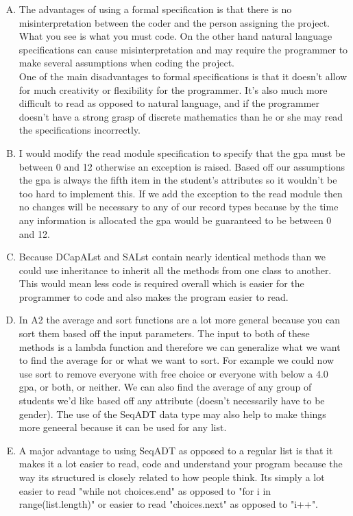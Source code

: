 \documentclass[12pt]{article}
\begin{document}
\begin{enumerate}[A)]

\item The advantages of using a formal specification is that there is no misinterpretation between the coder and the person assigning the project. What you see is what you must code. On the other hand
      natural language specifications can cause misinterpretation and may require the programmer to make several assumptions when coding the project.\\
      One of the main disadvantages to formal specifications is that it doesn't allow for much creativity or flexibility for the programmer. It's also much more difficult to read as opposed to natural language, and
      if the programmer doesn't have a strong grasp of discrete mathematics than he or she may read the specifications incorrectly.

\item I would modify the read module specification to specify that the gpa must be between 0 and 12 otherwise an exception is raised. Based off our assumptions the gpa is always the fifth item
      in the student's attributes so it wouldn't be too hard to implement this. If we add the exception to the read module then no changes will be necessary to any of our record types because
      by the time any information is allocated the gpa would be guaranteed to be between 0 and 12.

\item Because DCapALst and SALst contain nearly identical methods than we could use inheritance to inherit all the methods from one class to another.
      This would mean less code is required overall which is easier for the programmer to code and also makes the program easier to read.

\item In A2 the average and sort functions are a lot more general because you can sort them based off the input parameters. The input to both of these methods is a lambda function and therefore we can
      generalize what we want to find the average for or what we want to sort. For example we could now use sort to remove everyone with free choice or everyone with below a 4.0 gpa, or both, or neither. We can
      also find the average of any group of students we'd like based off any attribute (doesn't necessarily have to be gender). The use of the SeqADT data type may also help to make things more geneeral because it can be used for any list.

\item A major advantage to using SeqADT as opposed to a regular list is that it makes it a lot easier to read, code and understand your program because the way its structured is closely related to how people think. Its simply
      a lot easier to read "while not choices.end" as opposed to "for i in range(list.length)" or easier to read "choices.next" as opposed to "i++".


\end{enumerate}
\end{document}
